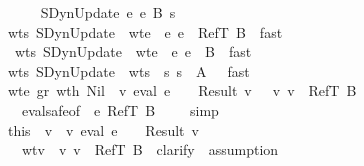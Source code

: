 \begin{isabellebody}
\ \ \ \ \isamarkupfalse \isanewline
\ \ \ \ \ \ \isamarkupfalse \ {\isacharparenleft}SDynUpdate\ e{}\ e{}\ B\ s{\isacharprime}{\isacharparenright}\isanewline
\ \ \ \ \ \ \isamarkupfalse \ wts\ SDynUpdate\ \isamarkupfalse \ wte{}{\isacharcolon}\ {\isachardoublequoteopen}{\isasymGamma}\ {\isasymturnstile}\isactrlisub e\ e{}\ {\isacharcolon}\ RefT\ B{\isachardoublequoteclose}\ \isamarkupfalse \ fast\isanewline
\ \ \ \ \ \ \isamarkupfalse \ \ wts\ SDynUpdate\ \isamarkupfalse \ wte{}{\isacharcolon}\ {\isachardoublequoteopen}{\isasymGamma}\ {\isasymturnstile}\isactrlisub e\ e{}\ {\isacharcolon}\ B{\isachardoublequoteclose}\ \isamarkupfalse \ fast\isanewline
\ \ \ \ \ \ \isamarkupfalse \ wts\ SDynUpdate\ \isamarkupfalse \ wts{}{\isacharcolon}\ {\isachardoublequoteopen}{\isasymGamma}\ {\isasymturnstile}\isactrlisub s\ s{\isacharprime}\ {\isacharcolon}\ A{\isacharprime}{\isachardoublequoteclose}\ \ \isamarkupfalse \ fast\ \isanewline
\ \ \ \ \ \ \isamarkupfalse \ wte{}\ gr\ wt{\isacharunderscore}h\ Nil\ \isamarkupfalse \ {\isachardoublequoteopen}{\isacharparenleft}{\isasymexists}v{}{\isachardot}\ eval\ e{}\ {\isasymrho}\ {\isasymmu}\ {\isacharequal}\ Result\ v{}\ {\isasymand}\ {\isasymSigma}\ {\isasymturnstile}v\ v{}\ {\isacharcolon}\ RefT\ B{\isacharparenright}{\isachardoublequoteclose}\isanewline
\ \ \ \ \ \ \ \ \isamarkupfalse \ eval{\isacharunderscore}safe{\isacharbrackleft}of\ {\isasymGamma}\ e{}\ {\isachardoublequoteopen}RefT\ B{\isachardoublequoteclose}\ {\isasymSigma}\ {\isasymrho}\ {\isasymmu}{\isacharbrackright}\ \isamarkupfalse \ simp\isanewline
\ \ \ \ \ \ \isamarkupfalse \ this\ \isamarkupfalse \ v{}\ \ v{}{\isacharcolon}\ {\isachardoublequoteopen}eval\ e{}\ {\isasymrho}\ {\isasymmu}\ {\isacharequal}\ Result\ v{}{\isachardoublequoteclose}\isanewline
\ \ \ \ \ \ \ \ \ wtv{}{\isacharcolon}\ {\isachardoublequoteopen}{\isasymSigma}\ {\isasymturnstile}v\ v{}\ {\isacharcolon}\ RefT\ B{\isachardoublequoteclose}\ \isamarkupfalse \ clarify\ \isamarkupfalse \ assumption\ \isamarkupfalse \isanewline

\end{isabellebody}
